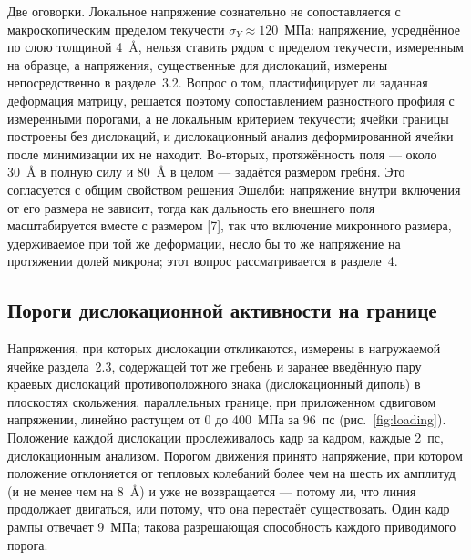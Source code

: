 Две оговорки. Локальное напряжение сознательно не сопоставляется с
макроскопическим пределом текучести $\sigma_Y \approx 120$~МПа: напряжение,
усреднённое по слою толщиной 4~\AA{}, нельзя ставить рядом с пределом
текучести, измеренным на образце, а напряжения, существенные для дислокаций,
измерены непосредственно в разделе~3.2. Вопрос о том, пластифицирует ли
заданная деформация матрицу, решается поэтому сопоставлением разностного
профиля с измеренными порогами, а не локальным критерием текучести; ячейки границы построены без дислокаций, и дислокационный анализ
деформированной ячейки после минимизации их не находит. Во-вторых, протяжённость поля --- около
30~\AA{} в полную силу и 80~\AA{} в целом --- задаётся размером гребня. Это
согласуется с общим свойством решения Эшелби: напряжение внутри включения
от его размера не зависит, тогда как дальность его внешнего поля
масштабируется вместе с размером [7], так что включение микронного размера,
удерживаемое при той же деформации, несло бы то же напряжение на протяжении
долей микрона; этот вопрос рассматривается в разделе~4.

\FloatBarrier
\subsection{Пороги дислокационной активности на границе}

Напряжения, при которых дислокации откликаются, измерены в нагружаемой
ячейке раздела~2.3, содержащей тот же гребень и заранее введённую пару
краевых дислокаций противоположного знака (дислокационный диполь) в
плоскостях скольжения, параллельных границе, при приложенном сдвиговом
напряжении, линейно растущем от 0 до 400~МПа за 96~пс
(рис.~\ref{fig:loading}). Положение каждой дислокации прослеживалось кадр за
кадром, каждые 2~пс, дислокационным анализом. Порогом движения принято
напряжение, при котором положение отклоняется от тепловых колебаний более
чем на шесть их амплитуд (и не менее чем на 8~\AA{}) и уже не возвращается
--- потому ли, что линия продолжает двигаться, или потому, что она
перестаёт существовать. Один кадр рампы отвечает 9~МПа; такова разрешающая
способность каждого приводимого порога.

